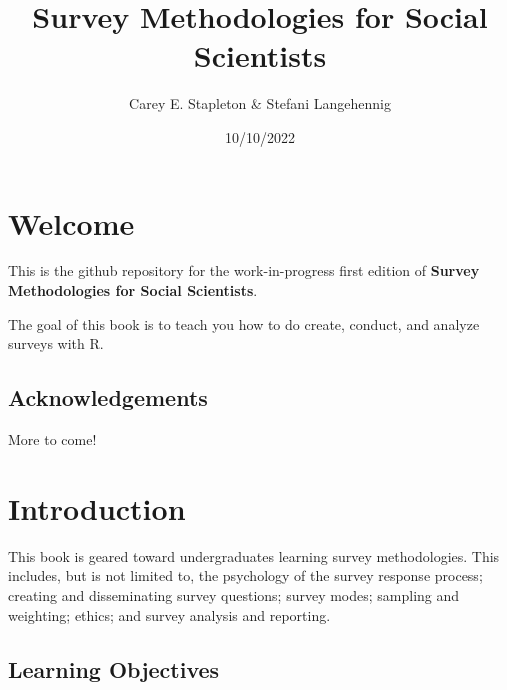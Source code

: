 \documentclass[
  letterpaper,
  DIV=11,
  numbers=noendperiod]{scrreprt}
\title{Survey Methodologies for Social Scientists}
\author{Carey E. Stapleton \& Stefani Langehennig}
\date{10/10/2022}
\renewcommand*\contentsname{Table of contents}
\newcommand\contentsname{Table of contents}
\begin{document}
\maketitle
\ifdefined\Shaded\renewenvironment{Shaded}{\begin{tcolorbox}[frame hidden, interior hidden, sharp corners, enhanced, boxrule=0pt, breakable, borderline west={3pt}{0pt}{shadecolor}]}{\end{tcolorbox}}\fi

\renewcommand*\contentsname{Table of contents}
{
\hypersetup{linkcolor=}
\setcounter{tocdepth}{2}
\tableofcontents
}

\hypertarget{welcome}{%
\chapter*{Welcome}\label{welcome}}

This is the github repository for the work-in-progress first edition of
\textbf{Survey Methodologies for Social Scientists}.

The goal of this book is to teach you how to do create, conduct, and
analyze surveys with R.

\hypertarget{acknowledgements}{%
\section*{Acknowledgements}\label{acknowledgements}}

More to come!


\hypertarget{ch01intro}{%
\chapter{Introduction}\label{ch01intro}}

This book is geared toward undergraduates learning survey methodologies.
This includes, but is not limited to, the psychology of the survey
response process; creating and disseminating survey questions; survey
modes; sampling and weighting; ethics; and survey analysis and
reporting.

\hypertarget{learning-objectives}{%
\section{Learning Objectives}\label{learning-objectives}}
\end{document}
